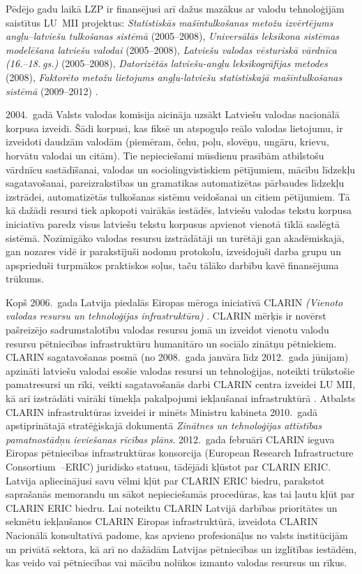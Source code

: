 \begin{multicols}{2}
Pēdējo gadu laikā LZP ir finansējusi arī dažus mazākus ar valodu tehnoloģijām saistītus LU~MII projektus: \textit{Statistiskās mašīntulkošanas metožu izvērtējums angļu--latviešu tulkošanas sistēmā} (2005--2008), \textit{Universālās leksikona sistēmas modelēšana latviešu valodai} (2005--2008), \textit{Latviešu valodas vēsturiskā vārdnīca (16.--18.${}^{~}$gs.)} (2005--2008), \textit{Datorizētās latviešu-angļu leksikogrāfijas metodes} (2008), \textit{Faktorēto metožu lietojums angļu-latviešu statistiskajā mašīntulkošanas sistēmā} (2009--2012) \cite{Meta27}.

2004.~gadā Valsts valodas komisija aicināja uzsākt Latviešu valodas nacionālā korpusa izveidi. 
Šādi korpusi, kas fiksē un atspoguļo reālo valodas lietojumu, ir izveidoti daudzām valodām (piemēram, čehu, poļu, slovēņu, ungāru, krievu, horvātu valodai un citām). 
Tie nepieciešami mūsdienu prasībām atbilstošu vārdnīcu sastādīšanai, valodas un sociolingvistiskiem pētījumiem, mācību līdzekļu sagatavošanai, pareizrakstības un gramatikas automatizētas pārbaudes līdzekļu izstrādei, automatizētās tulkošanas sistēmu veidošanai un citiem pētījumiem. 
Tā kā dažādi resursi tiek apkopoti vairākās iestādēs, latviešu valodas tekstu korpusa iniciatīva paredz visus latviešu tekstu korpusus apvienot vienotā tīklā saslēgtā sistēmā. 
Nozīmīgāko valodas resursu izstrādātāji un turētāji gan akadēmiskajā, gan nozares vidē ir parakstījuši nodomu protokolu, izveidojuši darba grupu un apsprieduši turpmākos praktiskos soļus, taču tālāko darbību kavē finansējuma trūkums.

Kopš 2006.~gada Latvija piedalās Eiropas mēroga iniciatīvā CLARIN \textit{(Vienoto valodas resursu un tehnoloģijas infrastruktūra)} \cite{metaClarin}. 
CLARIN mērķis ir novērst pašreizējo sadrumstalotību valodas resursu jomā un izveidot vienotu valodu resursu pētniecības infrastruktūru humanitāro un sociālo zinātņu pētniekiem.
CLARIN sagatavošanas posmā (no 2008.~gada janvāra līdz 2012.~gada jūnijam) apzināti latviešu valodai esošie valodas resursi un tehnoloģijas, noteikti trūkstošie pamatresursi un rīki, veikti sagatavošanās darbi CLARIN centra izveidei LU MII, kā arī izstrādāti vairāki tīmekļa pakalpojumi iekļaušanai infrastruktūrā \cite{metaClarin}.
Atbalsts CLARIN infrastruktūras izveidei ir minēts Ministru kabineta 2010.~gadā apstiprinātajā stratēģiskajā dokumentā \textit{Zinātnes un tehnoloģijas attīstības pamatnostādņu ieviešanas rīcības plāns}. 
2012.~gada februārī CLARIN ieguva Eiropas pētniecības infrastruktūras konsorcija (European Research Infrastructure Consortium~--ERIC) juridisko statusu, tādējādi kļūstot par CLARIN ERIC.
Latvija apliecinājusi savu vēlmi kļūt par CLARIN ERIC biedru, parakstot saprašanās memorandu un sākot nepieciešamās procedūras, kas tai ļautu kļūt par CLARIN ERIC biedru.
Lai noteiktu CLARIN Latvijā darbības prioritātes un sekmētu iekļaušanos CLARIN Eiropas infrastruktūrā, izveidota CLARIN Nacionālā konsultatīvā padome, kas apvieno profesionāļus no valsts institūcijām un privātā sektora, kā arī no dažādām Latvijas pētniecības un izglītības iestādēm, kas veido vai pētniecības vai mācību nolūkos izmanto valodas resursus un rīkus.


\end{multicols}

